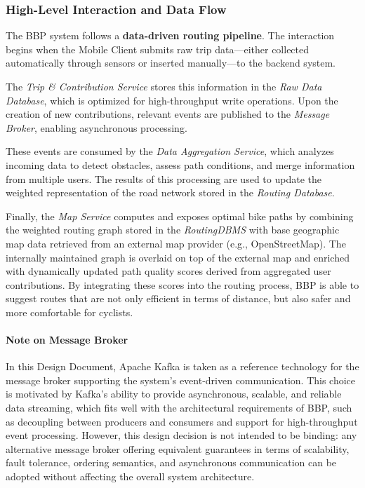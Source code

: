 \subsubsection{High-Level Interaction and Data Flow}
The BBP system follows a \textbf{data-driven routing pipeline}. The interaction begins when the Mobile Client submits raw trip data—either collected automatically through sensors or inserted manually—to the backend system.

The \textit{Trip \& Contribution Service} stores this information in the \textit{Raw Data Database}, which is optimized for high-throughput write operations. Upon the creation of new contributions, relevant events are published to the \textit{Message Broker}, enabling asynchronous processing.

These events are consumed by the \textit{Data Aggregation Service}, which analyzes incoming data to detect obstacles, assess path conditions, and merge information from multiple users. The results of this processing are used to update the weighted representation of the road network stored in the \textit{Routing Database}.

Finally, the \textit{Map Service} computes and exposes optimal bike paths by combining the weighted routing graph stored in the \textit{RoutingDBMS} with base geographic map data retrieved from an external map provider (e.g., OpenStreetMap). The internally maintained graph is overlaid on top of the external map and enriched with dynamically updated path quality scores derived from aggregated user contributions. By integrating these scores into the routing process, BBP is able to suggest routes that are not only efficient in terms of distance, but also safer and more comfortable for cyclists.


\paragraph{Note on Message Broker}
In this Design Document, Apache Kafka is taken as a reference technology for the message broker supporting the system’s event-driven communication. This choice is motivated by Kafka’s ability to provide asynchronous, scalable, and reliable data streaming, which fits well with the architectural requirements of BBP, such as decoupling between producers and consumers and support for high-throughput event processing.  
However, this design decision is not intended to be binding: any alternative message broker offering equivalent guarantees in terms of scalability, fault tolerance, ordering semantics, and asynchronous communication can be adopted without affecting the overall system architecture.



